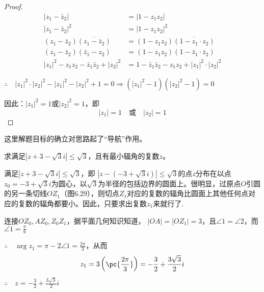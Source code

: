\begin{proof}
\[\begin{split}
    |z_1-\bar z_2|&=|1-z_1z_2|\\
     |z_1-\bar z_2|^2&=|1-z_1z_2|^2\\
(z_1-\bar z_2)\overline{(z_1-\bar z_2)}&=(1-z_1z_2)\overline{(1-z_1\cdot z_2)}   \\
 (z_1-\bar z_2)(\bar z_1-z_2)&=(1-z_1z_2)(1-\bar z_1\cdot \bar z_2)     \\
     |z_1|^2-z_1z_2-\bar z_1\bar z_2 +|z_2|^2&=1-\bar z_1\bar z_2-z_1z_2+|z_1|^2\cdot |z_2|^2     
\end{split}\]

$\therefore\quad |z_1|^2\cdot |z_2|^2-|z_1|^2- |z_2|^2+1=0 \Rightarrow (|z_1|^2-1)(|z_2|^2-1)=0$

因此：$|z_1|^2=1$或$|z_2|^2=1$，即
\[|z_1|=1\quad\text{或}\quad |z_2|=1\]
\end{proof}

\begin{rmk}
    这里解题目标的确立对思路起了“导航”作用。
\end{rmk}

\begin{example}
    求满足$|z+3-\sqrt{3}i|\le \sqrt{3}$，且有最小辐角的复数$z$。
\end{example}

\begin{solution}
    满足$|z+3-\sqrt{3}i|\le \sqrt{3}$，即
$\left|z-(-3+\sqrt{3}i)\right|\le \sqrt{3}$的点$z$分布在以点$z_0=-3+\sqrt{3}i$为圆心，以$\sqrt{3}$为半径的包括边界的圆面上。很明显，过原点$O$引圆的另一条切线$OZ_1$（图6.29），则切点$Z_1$对应的复数的辐角比圆面上其他任何点对应的复数的辐角都要小。因此，只要求出复数$z_1$来就行了.

\noindent
\begin{minipage}{.55\textwidth}
\CTEXindent  连接$OZ_0,AZ_0,Z_0Z_1$，据平面几何知识知道，
$|OA|=|OZ_1|=3$，且$\angle 1=\angle 2$，而$\angle 1=\frac{\pi}{6}$

$\therefore\quad \arg z_1=\pi-2\angle 1=\frac{2\pi}{3}$，从而
\[z_1=3\left(\pc{\frac{2\pi}{3}}\right)=-\frac{3}{2}+\frac{3\sqrt{3}}{2}i\]
$\therefore\quad z=-\frac{3}{2}+\frac{3\sqrt{3}}{2}i$    
\end{minipage}\hfill
\begin{minipage}{.4\textwidth}
\centering
{}
\end{minipage}
\end{solution}

